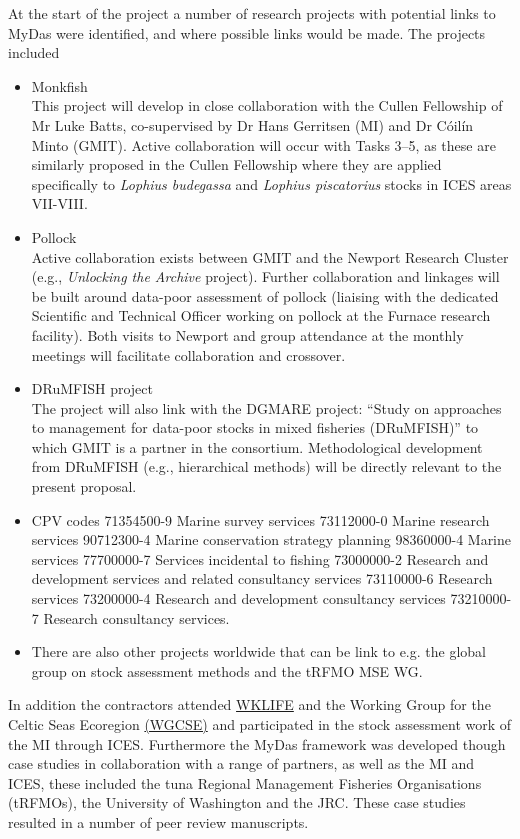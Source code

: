 At the start of the project a number of research projects with potential links to MyDas were identified, and where possible links would be made. The projects included

\begin{itemize}
 \item Monkfish\\
 This project will develop in close collaboration with the Cullen Fellowship of Mr Luke Batts, co-supervised by Dr Hans Gerritsen (MI) and Dr C\'oil\'in Minto (GMIT). Active collaboration will occur with Tasks 3--5, as these are similarly proposed in the Cullen Fellowship where they are applied specifically to \textit{Lophius budegassa} and \textit{Lophius piscatorius} stocks in ICES areas VII-VIII.
 \item Pollock \\
 Active collaboration exists between GMIT and the Newport Research Cluster (e.g., \emph{Unlocking the Archive} project). Further collaboration and linkages will be built around data-poor assessment of pollock (liaising with the dedicated Scientific and Technical Officer working on pollock at the Furnace research facility). Both visits to Newport and group attendance at the monthly meetings will facilitate collaboration and crossover.
 \item DRuMFISH project \\
 The project will also link with the DGMARE project: ``Study on approaches to management for data-poor stocks in mixed fisheries (DRuMFISH)'' to which GMIT is a partner in the consortium. Methodological development from DRuMFISH (e.g., hierarchical methods) will be directly relevant to the present proposal. 
 \item CPV codes 71354500-9 Marine survey services 73112000-0 Marine research services 90712300-4 Marine conservation strategy planning 98360000-4 Marine services 77700000-7 Services incidental to fishing 73000000-2 Research and development services and related consultancy services 73110000-6 Research services 73200000-4 Research and development consultancy services 73210000-7 Research consultancy services.
 \item There are also other projects worldwide that can be link to e.g. the global group on stock assessment methods and the tRFMO MSE WG. 
 \end{itemize}
 
In addition the contractors attended \href{http://ices.dk/sites/pub/Publication Reports/Expert Group Report/Fisheries Resources Steering Group/2019/WKLIFEIX/WKLIFE_IX_2019.pdf#page=30}{WKLIFE} and 
the Working Group for the Celtic Seas Ecoregion \href{https://www.ices.dk/community/groups/Pages/WGCSE.aspx}{(WGCSE)} and participated in the stock assessment work of the MI through ICES. Furthermore the MyDas framework was developed though case studies in collaboration with a range of partners, as well as the MI and ICES, these included the tuna Regional Management Fisheries Organisations (tRFMOs), the University of Washington and the JRC. These case studies resulted in a number of peer review manuscripts. 

